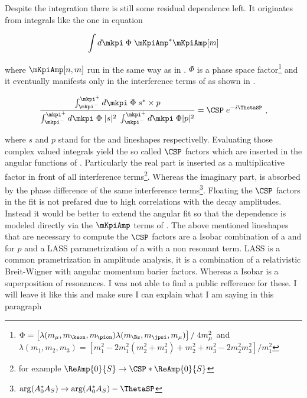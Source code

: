 Despite the \mkpi integration there is still some residual dependence left. It originates from integrals
like the one in equation 

\begin{equation}
  \label{spIntegrals}
  \int d\mkpi \; \Phi \; \mKpiAmp^* \mKpiAmp[m]
\end{equation}

\noindent where $\mKpiAmp[n,m]$ run in the same way as in . $\Phi$ is a phase space 
factor\footnote{$\Phi = \left[ \lambda(m_\mu,m_\kaon,m_\pion) \lambda(m_{\Bs},m_\jpsi,m_\mu) \right] / \; 4 m_\mu^2$  and \\ 
$\lambda(m_1,m_2,m_3) = \left[ m_1^2 - 2m_1^2(m_2^2 + m_3^2) + m_2^2 + m_3^2 - 2m_2^2m_3^2 \right] / m_1^2 $  
} and it eventually manifests only in the \spwave interference terms of  as shown
in .

\begin{equation}
  \label{csp_def}
  \frac{\int_{\mkpi^-}^{\mkpi^+} d\mkpi \; \Phi \; s^* \times p} {\int_{\mkpi^-}^{\mkpi^+} d\mkpi \; \Phi \; |s|^2 \; \int_{\mkpi^-}^{\mkpi^+} d\mkpi \; \Phi |p|^2} = \CSP \; e^{-i\ThetaSP} \ ,
\end{equation}

\noindent where $s$ and $p$ stand for the \swave and \pwave lineshapes respectivelly. Evaluating those complex valued integrals yield 
the so called $\CSP$ factors which are inserted in the angular functions of . Particularly the real part is inserted
as a multiplicative factor in front of all \spwave interference
terms\footnote{for example $\ReAmp{0}{S} \rightarrow \CSP * \ReAmp{0}{S} $}.
Whereas the imaginary part, is absorbed by the phase difference of the same interference 
terms\footnote{ $\arg(A_0^*A_S) \rightarrow \arg(A_0^*A_S) - \ThetaSP$}. Floating the $\CSP$ factors in the fit is not prefared due
to high correlations with the decay amplitudes. Instead it would be better to extend the angular fit so that the \mkpi dependence 
is modeled directly via the $\mKpiAmp$ terms of . The above mentioned \swave lineshapes that are necessary
to compute the $\CSP$ factors are a Isobar combination of a \KstENT and \KstOFOZ for $p$ and a LASS parametrization of a \KstOFTZ
with a non resonant term. LASS is a common \swave prametrization in amplitude analysis, it is a combination of a relativistic Breit-Wigner
with angular momentum barier factors. Whereas a Isobar is a superposition of resonances. {\color{red}I was not able to find a public refference for these. I
 will leave it like this and make sure I can explain what I am saying in this paragraph }


